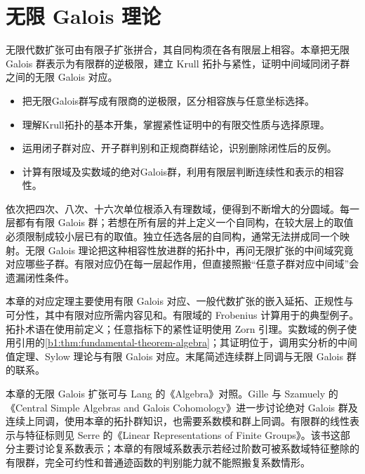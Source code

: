 
\chapter{无限 Galois 理论}
\label{b1:ch:22}

\begin{chapterabstract}
	无限代数扩张可由有限子扩张拼合，其自同构须在各有限层上相容。本章把无限 Galois 群表示为有限群的逆极限，建立 Krull 拓扑与紧性，证明中间域同闭子群之间的无限 Galois 对应。
\end{chapterabstract}

\begin{learninggoals}
	\begin{itemize}
		\item 把无限Galois群写成有限商的逆极限，区分相容族与任意坐标选择。
		\item 理解Krull拓扑的基本开集，掌握紧性证明中的有限交性质与选择原理。
		\item 运用闭子群对应、开子群判别和正规商群结论，识别删除闭性后的反例。
		\item 计算有限域及实数域的绝对Galois群，利用有限层判断连续性和表示的相容性。
	\end{itemize}
\end{learninggoals}

依次把四次、八次、十六次单位根添入有理数域，便得到不断增大的分圆域。每一层都有有限 Galois 群；若想在所有层的并上定义一个自同构，在较大层上的取值必须限制成较小层已有的取值。独立任选各层的自同构，通常无法拼成同一个映射。无限 Galois 理论把这种相容性放进群的拓扑中，再问无限扩张的中间域究竟对应哪些子群。有限对应仍在每一层起作用，但直接照搬“任意子群对应中间域”会遗漏闭性条件。

\ProseParagraphBreak

本章的对应定理主要使用有限 Galois 对应、一般代数扩张的嵌入延拓、正规性与可分性，其中有限对应所需内容见和。有限域的 Frobenius 计算用于的典型例子。拓扑术语在使用前定义；任意指标下的紧性证明使用 Zorn 引理。实数域的例子使用引用的\cref{b1:thm:fundamental-theorem-algebra}；其证明位于，调用实分析的中间值定理、Sylow 理论与有限 Galois 对应。末尾简述连续群上同调与无限 Galois 群的联系。


\ProseParagraphBreak
本章的无限 Galois 扩张可与 Lang 的《Algebra》\cite[Chapter VI, \S 14]{Lang2002}对照。Gille 与 Szamuely 的《Central Simple Algebras and Galois Cohomology》\cite[Sections 4.1--4.2]{GilleSzamuely2017CentralSimpleAlgebras}进一步讨论绝对 Galois 群及连续上同调，使用本章的拓扑群知识，也需要系数模和群上同调。有限群的线性表示与特征标则见 Serre 的《Linear Representations of Finite Groups》\cite[Part I, Chapters 1--2, pp. 3--24]{Serre1977FiniteRepresentations}。该书这部分主要讨论复系数表示；本章的有限域系数表示若经过阶数可被系数域特征整除的有限群，完全可约性和普通迹函数的判别能力就不能照搬复系数情形。

